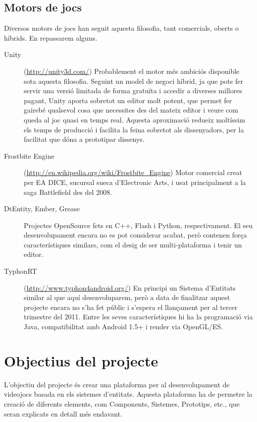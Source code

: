 \subsection{Motors de jocs}

Diversos motors de jocs han seguit aquesta filosofia, tant comercials, oberts o híbrids. En repassarem alguns.

\begin{description}
  \item[Unity] (\url{http://unity3d.com/}) Probablement el motor més ambiciós disponible sota aquesta filosofia. Seguint un model de negoci híbrid, ja que pots fer servir una versió limitada de forma gratuïta i accedir a diverses millores pagant, Unity aporta sobretot un editor molt potent, que permet fer gairebé qualsevol cosa que necessites des del mateix editor i veure com queda al joc quasi en temps real. Aquesta aproximació redueix moltíssim els temps de producció i facilita la feina sobretot als dissenyadors, per la facilitat que dóna a prototipar dissenys.
    
  \item[Frostbite Engine] (\url{http://en.wikipedia.org/wiki/Frostbite_Engine}) Motor comercial creat per EA DICE, sucursal sueca d'Electronic Arts, i usat principalment a la saga Battlefield des del 2008.
    
  \item[DtEntity, Ember, Grease] \citep{EntityWiki} Projectes OpenSource fets en C++, Flash i Python, respectivament. El seu desenvolupament encara no es pot considerar acabat, però contenen força característiques similars, com el desig de ser multi-plataforma i tenir un editor.
    
  \item[TyphonRT] (\url{http://www.typhon4android.org/}) En principi un Sistema d'Entitats similar al que aquí desenvoluparem, però a data de finalitzar aquest projecte encara no s'ha fet públic i s'espera el llançament per al tercer trimestre del 2011. Entre les seves característiques hi ha la programació via Java, compatibilitat amb Android 1.5+ i render via OpenGL/ES.
  
\end{description}

\section{Objectius del projecte}

L'objectiu del projecte és crear una plataforma per al desenvolupament de videojocs basada en els sistemes d'entitats. Aquesta plataforma ha de permetre la creació de diferents elements, com Components, Sistemes, Prototips, etc., que seran explicats en detall més endavant.

